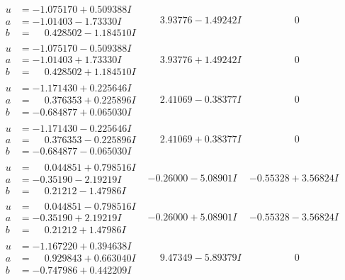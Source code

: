 \documentclass[1p]{elsarticle_modified}
\theoremstyle{definition}
\begin{document}
$$\begin{array}{c|c|c}
\begin{aligned}
u &= -1.075170 + 0.509388 I \\
a &= -1.01403 - 1.73330 I \\
b &= \phantom{-}0.428502 - 1.184510 I\end{aligned}
 & \phantom{-}3.93776 - 1.49242 I & \phantom{-0.000000 } 0 \\ \hline\begin{aligned}
u &= -1.075170 - 0.509388 I \\
a &= -1.01403 + 1.73330 I \\
b &= \phantom{-}0.428502 + 1.184510 I\end{aligned}
 & \phantom{-}3.93776 + 1.49242 I & \phantom{-0.000000 } 0 \\ \hline\begin{aligned}
u &= -1.171430 + 0.225646 I \\
a &= \phantom{-}0.376353 + 0.225896 I \\
b &= -0.684877 + 0.065030 I\end{aligned}
 & \phantom{-}2.41069 - 0.38377 I & \phantom{-0.000000 } 0 \\ \hline\begin{aligned}
u &= -1.171430 - 0.225646 I \\
a &= \phantom{-}0.376353 - 0.225896 I \\
b &= -0.684877 - 0.065030 I\end{aligned}
 & \phantom{-}2.41069 + 0.38377 I & \phantom{-0.000000 } 0 \\ \hline\begin{aligned}
u &= \phantom{-}0.044851 + 0.798516 I \\
a &= -0.35190 - 2.19219 I \\
b &= \phantom{-}0.21212 - 1.47986 I\end{aligned}
 & -0.26000 - 5.08901 I & -0.55328 + 3.56824 I \\ \hline\begin{aligned}
u &= \phantom{-}0.044851 - 0.798516 I \\
a &= -0.35190 + 2.19219 I \\
b &= \phantom{-}0.21212 + 1.47986 I\end{aligned}
 & -0.26000 + 5.08901 I & -0.55328 - 3.56824 I \\ \hline\begin{aligned}
u &= -1.167220 + 0.394638 I \\
a &= \phantom{-}0.929843 + 0.663040 I \\
b &= -0.747986 + 0.442209 I\end{aligned}
 & \phantom{-}9.47349 - 5.89379 I & \phantom{-0.000000 } 0 \\ \hline\begin{aligned}

\end{aligned}
\end{array}$$
\end{document}
